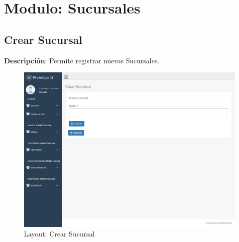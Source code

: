 \section{Modulo: Sucursales}

\subsection{Crear Sucursal}
\textbf{Descripción}: Permite registrar nuevas Sucursales.\\
\begin{figure}[h]
	\label{tab:layout-crearsucursalpage}
	\includegraphics[width=\linewidth]{ui-prototype/SucursalServices/CrearSucursalPage.png}
	\caption{Layout: Crear Sucursal}
\end{figure}

\begin{table}[t]
	\caption{Forma: Crear Sucursal}
	\label{tab:campos-crearsucursalpage}
\end{table}


